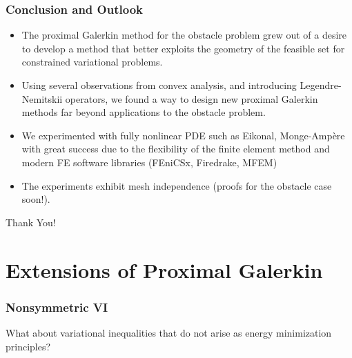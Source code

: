 \documentclass[aspectratio=169,xcolor=dvipsnames,11pt]{beamer}
\begin{document}
\begin{frame}
\begin{figure}
\end{figure}
\end{frame}



\begin{frame}\frametitle{Conclusion and Outlook}
\begin{itemize}
\item The proximal Galerkin method for the obstacle problem grew out of a desire to develop a method that better exploits the geometry of the feasible set for constrained variational problems.
\item \pause Using several observations from convex analysis, and introducing Legendre-Nemitskii operators, we found a way to design new proximal Galerkin methods far beyond applications to the obstacle problem.
\item \pause We experimented with fully nonlinear PDE such as Eikonal, Monge-Amp\`ere with great success due to the flexibility of the finite element method and modern FE software libraries (FEniCSx, Firedrake, MFEM)
\item \pause The experiments exhibit mesh independence (proofs for the obstacle case soon!).
\end{itemize}
\begin{center}
\Huge Thank You!
\end{center}
\end{frame}

\appendix

\section*{Extensions of Proximal Galerkin}
\begin{frame}\frametitle{Nonsymmetric VI}
{\Large
{\color{Maroon}
What about variational inequalities that do not arise as energy minimization principles?
}
}
\end{frame}
\end{document}
